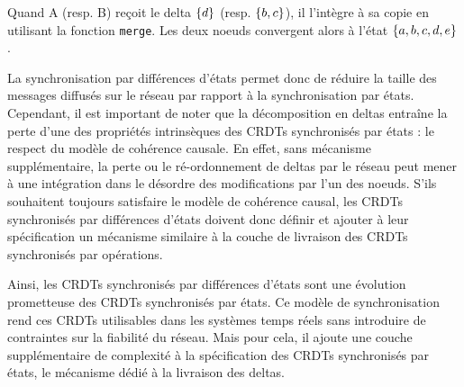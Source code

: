 Quand A (resp. B) reçoit le delta $\left\{d\right\}$ (resp. $\left\{b,c\right\}$), il l'intègre à sa copie en utilisant la fonction \texttt{merge}.
Les deux noeuds convergent alors à l'état $\left\{a,b,c,d,e\right\}$.

La synchronisation par différences d'états permet donc de réduire la taille des messages diffusés sur le réseau par rapport à la synchronisation par états.
Cependant, il est important de noter que la décomposition en deltas entraîne la perte d'une des propriétés intrinsèques des \acp{CRDT} synchronisés par états : le respect du modèle de cohérence causale.
En effet, sans mécanisme supplémentaire, la perte ou le ré-ordonnement de deltas par le réseau peut mener à une intégration dans le désordre des modifications par l'un des noeuds.
S'ils souhaitent toujours satisfaire le modèle de cohérence causal, les \acp{CRDT} synchronisés par différences d'états doivent donc définir et ajouter à leur spécification un mécanisme similaire à la couche de livraison des \acp{CRDT} synchronisés par opérations.

Ainsi, les \acp{CRDT} synchronisés par différences d'états sont une évolution prometteuse des \acp{CRDT} synchronisés par états.
Ce modèle de synchronisation rend ces \acp{CRDT} utilisables dans les systèmes temps réels sans introduire de contraintes sur la fiabilité du réseau.
Mais pour cela, il ajoute une couche supplémentaire de complexité à la spécification des \acp{CRDT} synchronisés par états, \ie le mécanisme dédié à la livraison des deltas.
